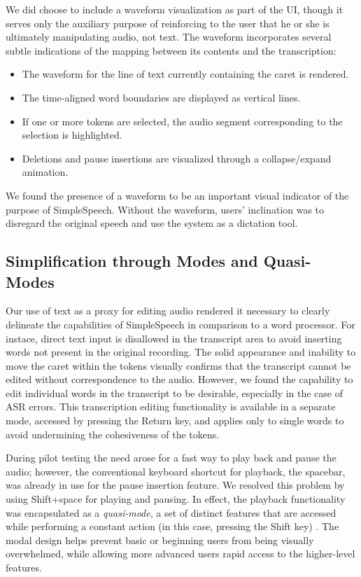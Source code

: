 We did choose to include a waveform visualization as part of the UI, though it serves only the auxiliary purpose of reinforcing to the user that he or she is ultimately manipulating audio, not text. The waveform incorporates several subtle indications of the mapping between its contents and the transcription:
\begin{itemize}
	\item The waveform for the line of text currently containing the caret is rendered.
	\item The time-aligned word boundaries are displayed as vertical lines.
	\item If one or more tokens are selected, the audio segment corresponding to the selection is highlighted.
	\item Deletions and pause insertions are visualized through a collapse/expand animation.
\end{itemize}
We found the presence of a waveform to be an important visual indicator of the purpose of SimpleSpeech.
Without the waveform, users' inclination was to disregard the original speech and use the system as a dictation tool.

\subsection{Simplification through Modes and Quasi-Modes}
Our use of text as a proxy for editing audio rendered it necessary to clearly delineate the capabilities of SimpleSpeech in comparison to a word processor.
For instace, direct text input is disallowed in the transcript area to avoid inserting words not present in the original recording.
The solid appearance and inability to move the caret within the tokens visually confirms that the transcript cannot be edited without correspondence to the audio.
However, we found the capability to edit individual words in the transcript to be desirable, especially in the case of ASR errors.
This transcription editing functionality is available in a separate mode, accessed by pressing the Return key, and applies only to single words to avoid undermining the cohesiveness of the tokens. 

During pilot testing the need arose for a fast way to play back and pause the audio; however, the conventional keyboard shortcut for playback, the spacebar, was already in use for the pause insertion feature.
We resolved this problem by using Shift+space for playing and pausing.
In effect, the playback functionality was encapsulated as a \emph{quasi-mode}, a set of distinct features that are accessed while performing a constant action (in this case, pressing the Shift key) \cite{raskin}. 
The modal design helps prevent basic or beginning users from being visually overwhelmed, while allowing more advanced users rapid access to the higher-level features.

